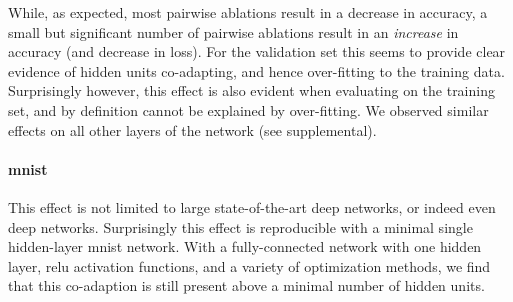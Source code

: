 \documentclass[thesis]{subfiles}
\begin{document}
While, as expected, most pairwise ablations result in a decrease in accuracy, a small but significant number of pairwise ablations result in an \emph{increase} in accuracy (and decrease in loss). For the validation set this seems to provide clear evidence of hidden units co-adapting, and hence over-fitting to the training data. Surprisingly however, this effect is also evident when evaluating on the training set, and by definition cannot be explained by over-fitting. We observed similar effects on all other layers of the network (see supplemental).


\paragraph{\gls{mnist}} This effect is not limited to large state-of-the-art deep networks, or indeed even deep networks. Surprisingly this effect is reproducible with a minimal single hidden-layer \gls{mnist} network. With a fully-connected network with one hidden layer, \gls{relu} activation functions, and a variety of optimization methods, we find that this co-adaption is still present above a minimal number of hidden units.  
\end{document}
